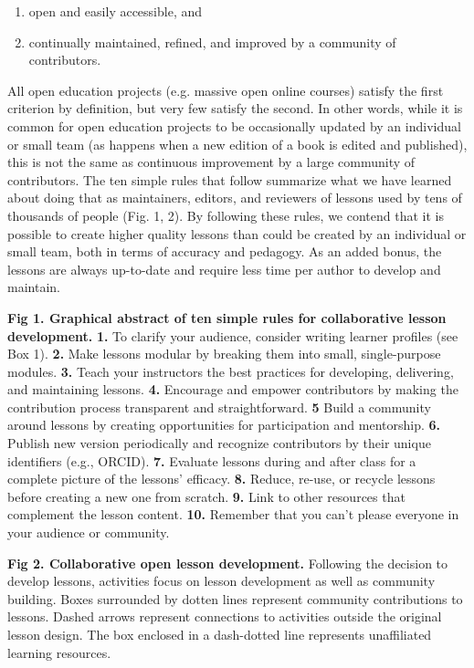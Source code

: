 \documentclass[10pt,letterpaper]{article}
\begin{document}
\begin{enumerate}

\item
  open and easily accessible, and

\item
  continually maintained, refined, and improved
  by a community of contributors.

\end{enumerate}

All open education projects (e.g. massive open online courses) satisfy the first criterion by definition,
but very few satisfy the second.
In other words,
while it is common for open education projects to be occasionally updated by an individual or small team
(as happens when a new edition of a book is edited and published),
this is not the same as continuous improvement by a large community of contributors.
The ten simple rules that follow summarize what we have learned about doing that
as maintainers, editors, and reviewers of lessons used by tens of thousands of people (Fig. 1, 2).
By following these rules,
we contend that it is possible to create higher quality lessons 
than could be created by an individual or small team,
both in terms of accuracy and pedagogy.
As an added bonus, the lessons are always up-to-date 
and require less time per author to develop and maintain.

\textbf{Fig 1. Graphical abstract of ten simple rules for collaborative lesson development.} \textbf{1.} To clarify your audience, consider writing learner profiles (see Box 1). \textbf{2.} Make lessons modular by breaking them into small, single-purpose modules. \textbf{3.} Teach your instructors the best practices for developing, delivering, and maintaining lessons. \textbf{4.} Encourage and empower contributors by making the contribution process transparent and straightforward. \textbf{5} Build a community around lessons by creating opportunities for participation and mentorship. \textbf{6.} Publish new version periodically and recognize contributors by their unique identifiers (e.g., ORCID). \textbf{7.} Evaluate lessons during and after class for a complete picture of the lessons' efficacy. \textbf{8.} Reduce, re-use, or recycle lessons before creating a new one from scratch. \textbf{9.} Link to other resources that complement the lesson content. \textbf{10.} Remember that you can't please everyone in your audience or community.

\textbf{Fig 2. Collaborative open lesson development.} Following the decision to develop 
lessons, activities focus on lesson development as well as community building. 
Boxes surrounded by dotten lines represent community contributions to lessons.
Dashed arrows represent connections to activities outside the original lesson design.
The box enclosed in a dash-dotted line represents unaffiliated learning resources.
\end{document}
